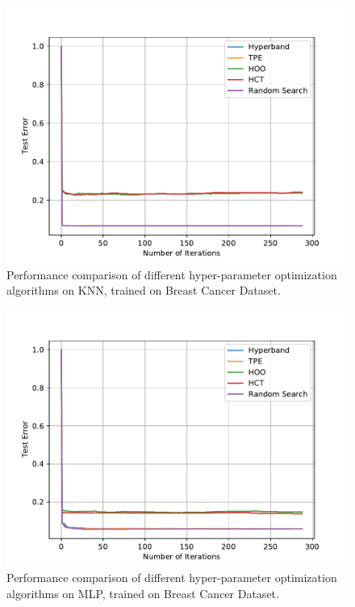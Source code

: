 \documentclass[runningheads,a4paper]{llncs}
\begin{document}
\begin{figure}[ht]
    \centering
    \includegraphics[scale=0.8]{img/uci/knn_1.pdf}
    \caption{Performance comparison of different hyper-parameter optimization algorithms on KNN, trained on Breast Cancer Dataset.}
    \label{knn_1}
\end{figure}

\begin{figure}[ht]
    \centering
    \includegraphics[scale=0.8]{img/uci/sk_mlp_1.pdf}
    \caption{Performance comparison of different hyper-parameter optimization algorithms on MLP, trained on Breast Cancer Dataset.}
    \label{sk_mlp_1}
\end{figure}
\end{document}
